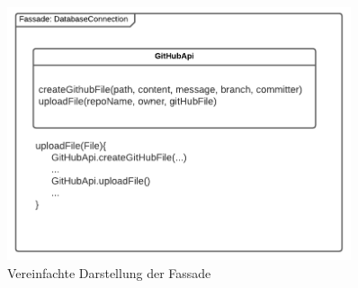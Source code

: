 \begin{figure}
    \centering
    \includegraphics[width=0.9\textwidth]{res/fassade_database_connection.png} 
    \caption{Vereinfachte Darstellung der Fassade} 
    \label{pic:fassade_database_connection}
\end{figure}

